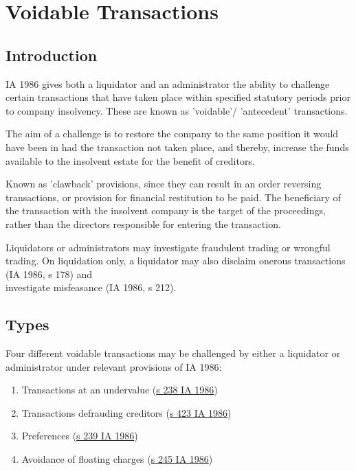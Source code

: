 \documentclass[
]{article}
\providecommand{\tightlist}{%
  \setlength{\itemsep}{0pt}\setlength{\parskip}{0pt}}
\begin{document}
\hypertarget{voidable-transactions}{%
\section{Voidable Transactions}\label{voidable-transactions}}

\hypertarget{introduction}{%
\subsection{Introduction}\label{introduction}}

IA 1986 gives both a liquidator and an administrator the ability to
challenge certain transactions that have taken place within specified
statutory periods prior to company insolvency. These are known as
'voidable'/ 'antecedent' transactions.

The aim of a challenge is to restore the company to the same position it
would have been in had the transaction not taken place, and thereby,
increase the funds available to the insolvent estate for the benefit of
creditors.

Known as 'clawback' provisions, since they can result in an order
reversing transactions, or provision for financial restitution to be
paid. The beneficiary of the transaction with the insolvent company is
the target of the proceedings, rather than the directors responsible for
entering the transaction.

Liquidators or administrators may investigate fraudulent trading or
wrongful trading. On liquidation only, a liquidator may also disclaim
onerous transactions (IA 1986, s 178) and\\
investigate misfeasance (IA 1986, s 212).

\hypertarget{types}{%
\subsection{Types}\label{types}}

Four different voidable transactions may be challenged by either a
liquidator or administrator under relevant provisions of IA 1986:

\begin{enumerate}
\tightlist
\item
  Transactions at an undervalue
  (\href{https://www.legislation.gov.uk/ukpga/1986/45/section/238}{s 238
  IA 1986})
\item
  Transactions defrauding creditors
  (\href{https://www.legislation.gov.uk/ukpga/1986/45/section/238}{s 423
  IA 1986})
\item
  Preferences
  (\href{https://www.legislation.gov.uk/ukpga/1986/45/section/238}{s 239
  IA 1986})
\item
  Avoidance of floating charges
  (\href{https://www.legislation.gov.uk/ukpga/1986/45/section/238}{s 245
  IA 1986})
\end{enumerate}
\end{document}
